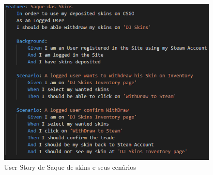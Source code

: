 \documentclass[
    12pt,               %
    openright,          %
    oneside,
    a4paper,            %
    MODELO,             %
    TODO,               %
    english,            %
    brazil              %
    ]{ifsp-spo-inf-ctds} %
\begin{document}
\begin{apendicesenv}
	\begin{figure}[!htb]
		\centering
		\includegraphics[scale=0.9]{Imagens/SaqueSkins.png}
		\caption{User Story de Saque de skins e seus cenários}
	\end{figure}

	
\end{apendicesenv}
\end{document}
